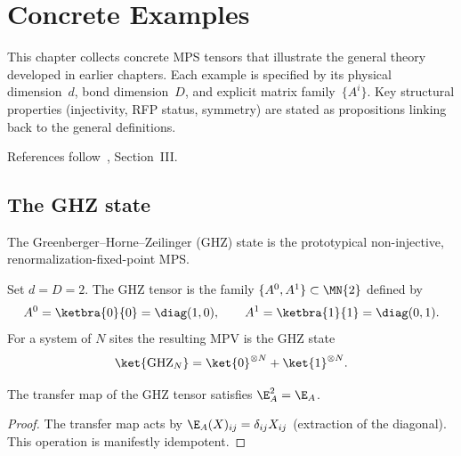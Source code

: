 \chapter{Concrete Examples}\label{ch:examples}

This chapter collects concrete MPS tensors that illustrate the general
theory developed in earlier chapters.  Each example is specified by its
physical dimension~$d$, bond dimension~$D$, and explicit matrix
family~$\{A^i\}$.  Key structural properties (injectivity, RFP status,
symmetry) are stated as propositions linking back to the general
definitions.

References follow~\cite{Cirac2021Matrix}, Section~III.

\section{The GHZ state}\label{sec:ghz}

The Greenberger--Horne--Zeilinger (GHZ) state is the prototypical
non-injective, renormalization-fixed-point MPS.

\begin{definition}\label{def:ghz_tensor}
    \leanok
    Set $d = D = 2$.  The GHZ tensor is the family
    $\{A^0, A^1\} \subset \MN{2}$ defined by
    \[
        A^0 = \ketbra{0}{0} = \diag(1,0),
        \qquad
        A^1 = \ketbra{1}{1} = \diag(0,1).
    \]
    For a system of $N$ sites the resulting MPV is the GHZ state
    \[
        \ket{\mathrm{GHZ}_N}
        = \ket{0}^{\otimes N} + \ket{1}^{\otimes N}.
    \]
\end{definition}

\begin{theorem}\label{thm:ghz_transfer_idempotent}
    \leanok
    The transfer map of the GHZ tensor satisfies $\E_A^2 = \E_A$.
\end{theorem}

\begin{proof}
    \leanok
    The transfer map acts by
    $\E_A(X)_{ij} = \delta_{ij} X_{ij}$
    (extraction of the diagonal).
    This operation is manifestly idempotent.
\end{proof}

